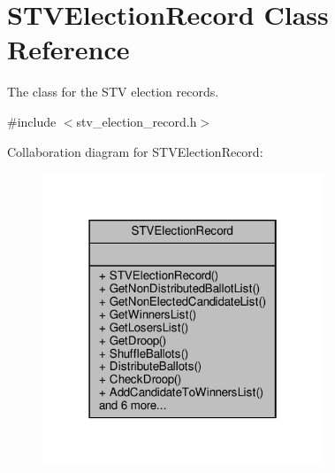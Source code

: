 \hypertarget{classSTVElectionRecord}{}\section{S\+T\+V\+Election\+Record Class Reference}
\label{classSTVElectionRecord}


The class for the S\+TV election records.  




{\ttfamily \#include $<$stv\+\_\+election\+\_\+record.\+h$>$}



Collaboration diagram for S\+T\+V\+Election\+Record\+:\nopagebreak
\begin{figure}[H]
\begin{center}
\leavevmode
\includegraphics[width=238pt]{classSTVElectionRecord__coll__graph}
\end{center}
\end{figure}

